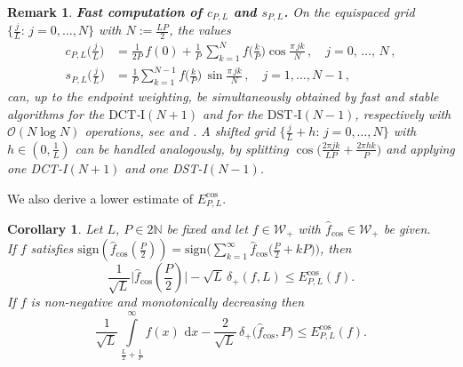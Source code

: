 \documentclass[11pt,a4paper]{scrartcl}
\renewcommand{\d}{\,\mathrm{d}}
\newtheorem{remark}[theorem]{Remark}
\newtheorem{corollary}[theorem]{Corollary}
\numberwithin{equation}{section}
\numberwithin{table}{section}
\numberwithin{figure}{section}
\newcommand{\sign}{\mathrm{sign}}
\newcommand{\N}{\mathbb N}
\newcommand{\Wp}{{\mathcal W}_{+}}
\newcommand{\fcos}{{\hat f}_{\cos}}
\newcommand{\dpl}{\delta_{+}}
\newcommand{\Ecos}{E^{\cos}}
\begin{document}
\begin{remark}
	\label{Rem:DCTI} \textbf{Fast computation of $c_{P,L}$ and $s_{P,L}$.}
	On the equispaced grid $\big\{\tfrac{j}{L}:\,j=0,\ldots,N\big\}$ with $N :=
	\tfrac{LP}{2}$, the values
	\begin{align*}
	\textstyle c_{P,L}\big(\tfrac{j}{L}\big) &=  \textstyle \frac{1}{2P}\,f(0) + \frac{1}{P}\,\sum\limits_{k=1}^{N} f\big(\tfrac{k}{P}\big) \cos \frac{\pi\,j k}{N}\,,\quad j =0,\,\ldots,\,N\,,\\
	\textstyle s_{P,L}\big(\tfrac{j}{L}\big) &=  \textstyle \frac{1}{P}\sum\limits_{k = 1}^{N-1} f\big(\tfrac{k}{P}\big)\,
	\sin \frac{\pi\,jk}{N}\,, \quad j = 1,\ldots, N-1\,,
		\end{align*}
	can, up to the endpoint weighting, be simultaneously obtained by fast and stable algorithms for the  $\mathrm{DCT}$-$\mathrm{I}(N+1)$
	and for the $\mathrm{DST}$-$\mathrm{I}(N-1)$, respectively with $\mathcal O(N \log N)$ operations,
	see \cite{PlTa05} and
	\cite[pp.~168--169, 367--381]{PlPoStTa23}. A shifted grid $\big\{\tfrac{j}{L}+h:\,j=0,\ldots,N\big\}$ with $h \in (0,\frac1L)$  can be
handled analogously, by splitting $\cos\big(\frac{2\pi jk}{LP}+\frac{2\pi hk}{P}\big)$ and
applying one DCT-I$(N+1)$ and one DST-I$(N-1)$.
\end{remark}

We also derive a lower estimate of $\Ecos_{P,L}$.
\begin{corollary}\label{corlower}
Let $L$, $P \in 2 \N$ be fixed and let $f \in \Wp$ with $\fcos \in \Wp$ be given.\\
If $f$ satisfies $\sign(\fcos(\frac{P}{2})) = \sign\big(\sum_{k=1}^\infty \fcos\big(\frac{P}{2} +kP\big)\big)$, then
\begin{equation}
\label{eq:cosbelow1}
 \textstyle    \frac{1}{\sqrt{L}} \big|\fcos(\frac{P}{2}) \big| - \sqrt{L} \,\dpl(f,L)
 \leq \Ecos_{P,L}(f).
\end{equation}
If $f$ is non-negative and monotonically decreasing then
\begin{equation}
\label{eq:cosbelow2}
 \textstyle   \frac{1}{\sqrt{L}}  \int\limits_{\frac{L}{2} + \frac{1}{P}}^{\infty} f(x) \, \d x-  \frac{2}{\sqrt L}\,\dpl\big(\fcos, P\big)
 \leq \Ecos_{P,L}(f).
\end{equation}
\end{corollary}
\end{document}
